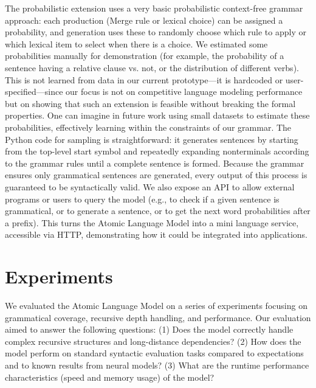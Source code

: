 \documentclass[11pt]{article}
\begin{document}
The probabilistic extension uses a very basic probabilistic context-free grammar approach: each production (Merge rule or lexical choice) can be assigned a probability, and generation uses these to randomly choose which rule to apply or which lexical item to select when there is a choice. We estimated some probabilities manually for demonstration (for example, the probability of a sentence having a relative clause vs. not, or the distribution of different verbs). This is not learned from data in our current prototype—it is hardcoded or user-specified—since our focus is not on competitive language modeling performance but on showing that such an extension is feasible without breaking the formal properties. One can imagine in future work using small datasets to estimate these probabilities, effectively learning within the constraints of our grammar. The Python code for sampling is straightforward: it generates sentences by starting from the top-level start symbol and repeatedly expanding nonterminals according to the grammar rules until a complete sentence is formed. Because the grammar ensures only grammatical sentences are generated, every output of this process is guaranteed to be syntactically valid. We also expose an API to allow external programs or users to query the model (e.g., to check if a given sentence is grammatical, or to generate a sentence, or to get the next word probabilities after a prefix). This turns the Atomic Language Model into a mini language service, accessible via HTTP, demonstrating how it could be integrated into applications.

\section{Experiments}
We evaluated the Atomic Language Model on a series of experiments focusing on grammatical coverage, recursive depth handling, and performance. Our evaluation aimed to answer the following questions: (1) Does the model correctly handle complex recursive structures and long-distance dependencies? (2) How does the model perform on standard syntactic evaluation tasks compared to expectations and to known results from neural models? (3) What are the runtime performance characteristics (speed and memory usage) of the model?
\end{document}
